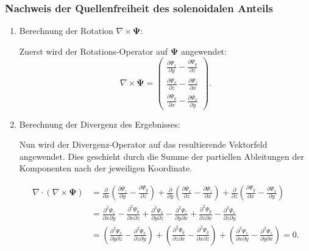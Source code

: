 \subsubsection{Nachweis der Quellenfreiheit des solenoidalen Anteils}

\begin{enumerate}
    \item Berechnung der Rotation $\nabla \times \mathbf{\Psi}$:
    
    Zuerst wird der Rotations-Operator auf $\mathbf{\Psi}$ angewendet:
    \[
    \nabla \times \mathbf{\Psi} =
    \begin{pmatrix}
        \frac{\partial \Psi_z}{\partial y} - \frac{\partial \Psi_y}{\partial z} \\
        \frac{\partial \Psi_x}{\partial z} - \frac{\partial \Psi_z}{\partial x} \\
        \frac{\partial \Psi_y}{\partial x} - \frac{\partial \Psi_x}{\partial y}
    \end{pmatrix}.
    \]

    \item Berechnung der Divergenz des Ergebnisses:
    
    Nun wird der Divergenz-Operator auf das resultierende Vektorfeld angewendet. Dies geschieht durch die Summe der partiellen Ableitungen der Komponenten nach der jeweiligen Koordinate.
    
    \begin{align*}
    \nabla \cdot (\nabla \times \mathbf{\Psi}) &= \frac{\partial}{\partial x}\left( \frac{\partial \Psi_z}{\partial y} - \frac{\partial \Psi_y}{\partial z} \right) + \frac{\partial}{\partial y}\left( \frac{\partial \Psi_x}{\partial z} - \frac{\partial \Psi_z}{\partial x} \right) + \frac{\partial}{\partial z}\left( \frac{\partial \Psi_y}{\partial x} - \frac{\partial \Psi_x}{\partial y} \right) \\[1em]
    &= \frac{\partial^2 \Psi_z}{\partial x \partial y} - \frac{\partial^2 \Psi_y}{\partial x \partial z} + \frac{\partial^2 \Psi_x}{\partial y \partial z} - \frac{\partial^2 \Psi_z}{\partial y \partial x} + \frac{\partial^2 \Psi_y}{\partial z \partial x} - \frac{\partial^2 \Psi_x}{\partial z \partial y} \\[1em]
    &= \left( \frac{\partial^2 \Psi_x}{\partial y \partial z} - \frac{\partial^2 \Psi_x}{\partial z \partial y} \right) + \left( \frac{\partial^2 \Psi_y}{\partial z \partial x} - \frac{\partial^2 \Psi_y}{\partial x \partial z} \right) + \left( \frac{\partial^2 \Psi_z}{\partial x \partial y} - \frac{\partial^2 \Psi_z}{\partial y \partial x} \right) = 0.
    \end{align*}
    

\end{enumerate}
